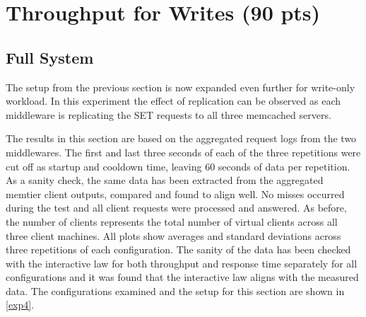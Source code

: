 \documentclass[11pt,a4paper]{article}
\begin{document}

\section{Throughput for Writes (90 pts)}

\subsection{Full System} \label{sec4}
The setup from the previous section is now expanded even further for write-only workload. In this experiment the effect of replication can be observed as each middleware is replicating the SET requests to all three memcached servers.

The results in this section are based on the aggregated request logs from the two middlewares. The first and last three seconds of each of the three repetitions were cut off as startup and cooldown time, leaving 60 seconds of data per repetition. As a sanity check, the same data has been extracted from the aggregated memtier client outputs, compared and found to align well. No misses occurred during the test and all client requests were processed and answered. As before, the number of clients represents the total number of virtual clients across all three client machines. All plots show averages and standard deviations across three repetitions of each configuration. The sanity of the data has been checked with the interactive law for both throughput and response time separately for all configurations and it was found that the interactive law aligns with the measured data. The configurations examined and the setup for this section are shown in \autoref{exp4}.
\end{document}
